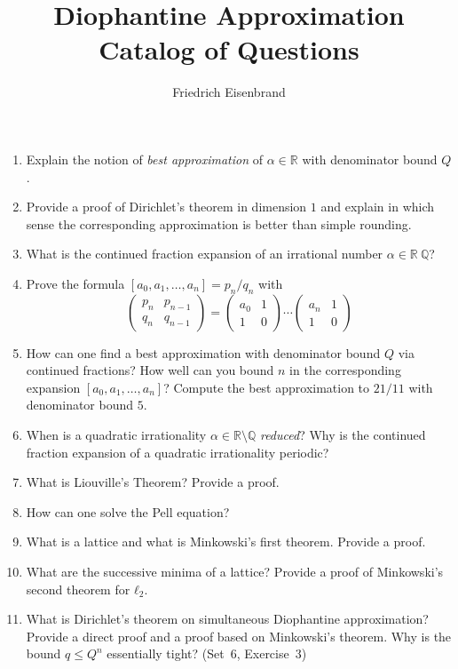 \documentclass[a4paper,11pt,american]{article}
\title{Diophantine Approximation \\ Catalog of Questions}
\author{Friedrich Eisenbrand}
\theoremstyle{plain}
\theoremstyle{definition}
\begin{document}
\maketitle


\begin{enumerate}
\item Explain the notion of \emph{best approximation} of $α ∈ℝ$ with denominator bound $Q$.
\item Provide a proof of Dirichlet's theorem in dimension $1$ and explain in which sense the corresponding approximation is better than simple rounding. 
\item What is the continued fraction expansion of an irrational number $α ∈ ℝ \ ℚ$?
\item Prove the formula $[a_0,a_1,\dots,a_n] = p_n / q_n$  with 
  \begin{displaymath}
    \begin{pmatrix}
    p_n & p_{n-1} \\
    q_n & q_{n-1}
  \end{pmatrix} =
  \begin{pmatrix}
    a_0 & 1\\
    1 & 0
  \end{pmatrix} \cdots
  \begin{pmatrix}
    a_n & 1 \\
    1 & 0
  \end{pmatrix}
  \end{displaymath}
\item How can one find a best approximation with denominator bound $Q$ via continued fractions? How well can you bound $n$ in the corresponding expansion $[a_0,a_1,\dots,a_n]$? Compute the best approximation to $21/11$ with denominator bound $5$.  
\item When is a quadratic irrationality $α ∈ ℝ \setminus  ℚ$ \emph{reduced}? Why is the continued fraction expansion of a quadratic irrationality periodic?
\item What is Liouville's Theorem? Provide a proof.
\item How can one solve the Pell equation?
\item What is a lattice and what is Minkowski's first theorem. Provide a proof.
\item What are the successive minima of a lattice? Provide a proof of Minkowski's second theorem for $ℓ_2$. 
\item What is   Dirichlet's theorem on simultaneous Diophantine approximation? Provide a direct proof and a proof based on Minkowski's theorem. Why is the bound $q ≤Q^n$ essentially tight? (Set~6, Exercise~3)

\end{enumerate}
\end{document}
